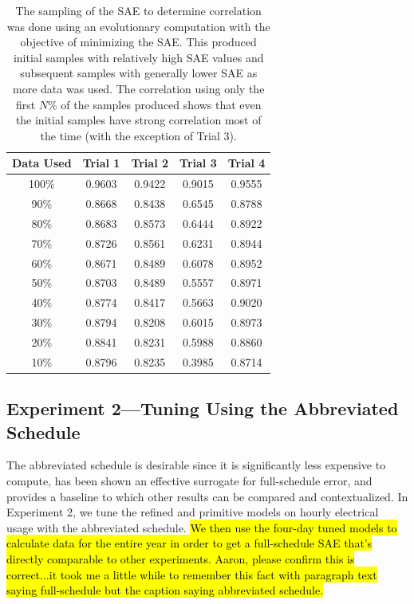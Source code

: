 \documentclass[preprint, review, 12pt]{elsarticle}
\begin{document}
\begin{table}[htbp]
\centering
\caption{The sampling of the SAE to determine correlation was done using an evolutionary computation with the objective of minimizing the SAE. This produced initial samples with relatively high SAE values and subsequent samples with generally lower SAE as more data was used. The correlation using only the first $N$\% of the samples produced shows that even the initial samples have strong correlation most of the time (with the exception of Trial 3).}
\label{tab:hour-corr}
\begin{tabular}{ccccc}
\toprule
Data Used & Trial 1 & Trial 2 & Trial 3 & Trial 4\\
\midrule
100\% & 0.9603 & 0.9422 & 0.9015 & 0.9555\\\rowcolor{DarkRow}
90\%  & 0.8668 & 0.8438 & 0.6545 & 0.8788\\
80\%  & 0.8683 & 0.8573 & 0.6444 & 0.8922\\\rowcolor{DarkRow}
70\%  & 0.8726 & 0.8561 & 0.6231 & 0.8944\\
60\%  & 0.8671 & 0.8489 & 0.6078 & 0.8952\\\rowcolor{DarkRow}
50\%  & 0.8703 & 0.8489 & 0.5557 & 0.8971\\
40\%  & 0.8774 & 0.8417 & 0.5663 & 0.9020\\\rowcolor{DarkRow}
30\%  & 0.8794 & 0.8208 & 0.6015 & 0.8973\\
20\%  & 0.8841 & 0.8231 & 0.5988 & 0.8860\\\rowcolor{DarkRow}
10\%  & 0.8796 & 0.8235 & 0.3985 & 0.8714\\
\bottomrule
\end{tabular}
\end{table}


\subsection{Experiment 2---Tuning Using the Abbreviated Schedule}
\label{sub:experiment2}
The abbreviated schedule is desirable since it is significantly less expensive to compute, has been shown an effective surrogate for full-schedule error, and provides a baseline to which other results can be compared and contextualized. In Experiment 2, we tune the refined and primitive models on hourly electrical usage with the abbreviated schedule. \hl{We then use the four-day tuned models to calculate data for the entire year in order to get a full-schedule SAE that's directly comparable to other experiments. Aaron, please confirm this is correct...it took me a little while to remember this fact with paragraph text saying full-schedule but the caption saying abbreviated schedule.}
\end{document}
